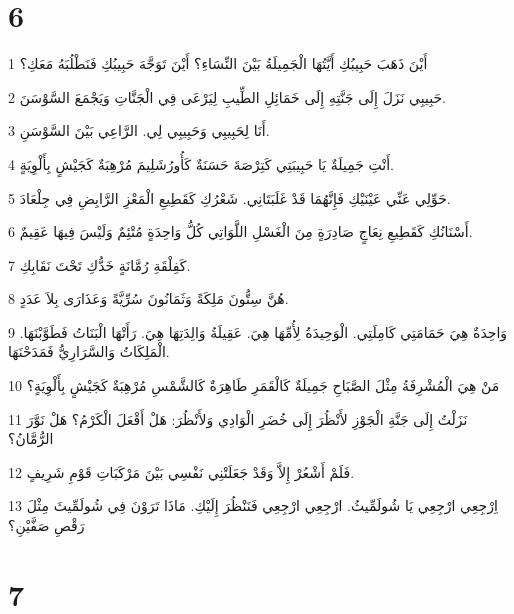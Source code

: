 \chapter{6}

\par 1 أَيْنَ ذَهَبَ حَبِيبُكِ أَيَّتُهَا الْجَمِيلَةُ بَيْنَ النِّسَاءِ؟ أَيْنَ تَوَجَّهَ حَبِيبُكِ فَنَطْلُبَهُ مَعَكِ؟
\par 2 حَبِيبِي نَزَلَ إِلَى جَنَّتِهِ إِلَى خَمَائِلِ الطِّيبِ لِيَرْعَى فِي الْجَنَّاتِ وَيَجْمَعَ السَّوْسَنَ.
\par 3 أَنَا لِحَبِيبِي وَحَبِيبِي لِي. الرَّاعِي بَيْنَ السَّوْسَنِ.
\par 4 أَنْتِ جَمِيلَةٌ يَا حَبِيبَتِي كَتِرْصَةَ حَسَنَةٌ كَأُورُشَلِيمَ مُرْهِبَةٌ كَجَيْشٍ بِأَلْوِيَةٍ.
\par 5 حَوِّلِي عَنِّي عَيْنَيْكِ فَإِنَّهُمَا قَدْ غَلَبَتَانِي. شَعْرُكِ كَقَطِيعِ الْمَعْزِ الرَّابِضِ فِي جِلْعَادَ.
\par 6 أَسْنَانُكِ كَقَطِيعِ نِعَاجٍ صَادِرَةٍ مِنَ الْغَسْلِ اللَّوَاتِي كُلُّ وَاحِدَةٍ مُتْئِمٌ وَلَيْسَ فِيهَا عَقِيمٌ.
\par 7 كَفِلْقَةِ رُمَّانَةٍ خَدُّكِ تَحْتَ نَقَابِكِ.
\par 8 هُنَّ سِتُّونَ مَلِكَةً وَثَمَانُونَ سُرِّيَّةً وَعَذَارَى بِلاَ عَدَدٍ.
\par 9 وَاحِدَةٌ هِيَ حَمَامَتِي كَامِلَتِي. الْوَحِيدَةُ لِأُمِّهَا هِيَ. عَقِيلَةُ وَالِدَتِهَا هِيَ. رَأَتْهَا الْبَنَاتُ فَطَوَّبْنَهَا. الْمَلِكَاتُ وَالسَّرَارِيُّ فَمَدَحْنَهَا.
\par 10 مَنْ هِيَ الْمُشْرِفَةُ مِثْلَ الصَّبَاحِ جَمِيلَةٌ كَالْقَمَرِ طَاهِرَةٌ كَالشَّمْسِ مُرْهِبَةٌ كَجَيْشٍ بِأَلْوِيَةٍ؟
\par 11 نَزَلْتُ إِلَى جَنَّةِ الْجَوْزِ لأَنْظُرَ إِلَى خُضَرِ الْوَادِي وَلأَنْظُرَ: هَلْ أَقْعَلَ الْكَرْمُ؟ هَلْ نَوَّرَ الرُّمَّانُ؟
\par 12 فَلَمْ أَشْعُرْ إِلاَّ وَقَدْ جَعَلَتْنِي نَفْسِي بَيْنَ مَرْكَبَاتِ قَوْمِ شَرِيفٍ.
\par 13 اِرْجِعِي ارْجِعِي يَا شُولَمِّيثُ. ارْجِعِي ارْجِعِي فَنَنْظُرَ إِلَيْكِ. مَاذَا تَرَوْنَ فِي شُولَمِّيثَ مِثْلَ رَقْصِ صَفَّيْنِ؟

\chapter{7}

